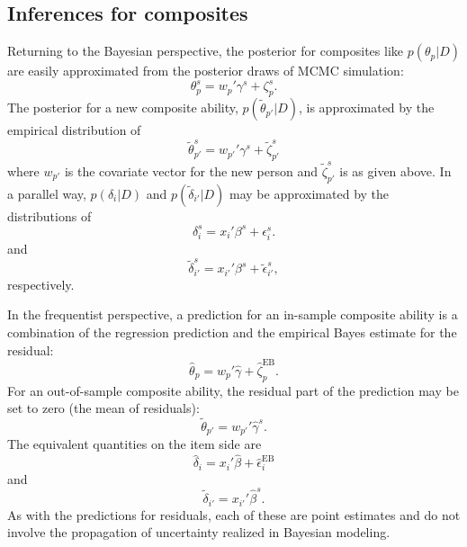 \documentclass[12pt, letterpaper]{article}
\begin{document}
\subsection{Inferences for composites}

Returning to the Bayesian perspective, the posterior for composites like $p(\theta_p | D)$ are easily approximated from the posterior draws of MCMC simulation:
\begin{equation}
	\theta_p^s
	= w_p' \gamma^s + \zeta_p^s
.\end{equation}
The posterior for a new composite ability, $p(\tilde \theta_{p'} | D)$, is approximated by the empirical distribution of
\begin{equation}
	\tilde \theta_{p'}^s
	= w_{p'}' \gamma^s + \tilde \zeta_{p'}^s
\end{equation}
where $w_{p'}$ is the covariate vector for the new person and $\tilde \zeta_{p'}^s$ is as given above. In a parallel way, $p(\delta_i | D)$ and $p(\tilde \delta_{i'} | D)$ may be approximated by the distributions of
\begin{equation}
	\delta_i^s
	= x_i' \beta^s + \epsilon_i^s
.\end{equation}
and
\begin{equation}
	\tilde \delta_{i'}^s
	= x_{i'}' \beta^s + \tilde \epsilon_{i'}^s
,\end{equation}
respectively.

In the frequentist perspective, a prediction for an in-sample composite ability is a combination of the regression prediction and the empirical Bayes estimate for the residual:
\begin{equation}
	\hat \theta_p
	= w_p' \hat \gamma + \hat \zeta_p^\mathrm{EB}
.\end{equation}
For an out-of-sample composite ability, the residual part of the prediction may be set to zero (the mean of residuals):
\begin{equation}
	\tilde \theta_{p'}
	= w_{p'}' \hat \gamma^s
.\end{equation}
The equivalent quantities on the item side are
\begin{equation}
	\hat \delta_i
	= x_i' \hat \beta + \hat \epsilon_i^\mathrm{EB}
\end{equation}
and
\begin{equation}
	\tilde \delta_{i'}
	= x_{i'}' \hat \beta^s
.\end{equation}
As with the predictions for residuals, each of these are point estimates and do not involve the propagation of uncertainty realized in Bayesian modeling.
\end{document}
